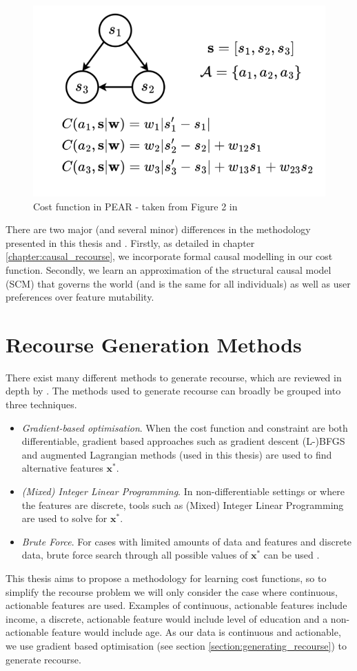\begin{figure}[!htb]
	\centering
	\includegraphics[width=0.5\linewidth]{images/detoni_et_al2.png}
	\caption{Cost function in PEAR - taken from Figure 2 in \textcite{detoniPersonalizedAlgorithmicRecourse2023}}
	\label{fig:detoni_et_al2}
\end{figure}

There are two major (and several minor) differences in the methodology presented in this thesis and \textcite{detoniPersonalizedAlgorithmicRecourse2023}. Firstly, as detailed in chapter \ref{chapter:causal_recourse}, we incorporate formal causal modelling \citep{pearl2016causal} in our cost function. Secondly, we learn an approximation of the structural causal model (SCM) that governs the world (and is the same for all individuals) as well as user preferences over feature mutability.


\section{Recourse Generation Methods}

There exist many different methods to generate recourse, which are reviewed in depth by \textcite{karimiSurveyAlgorithmicRecourse2022}. The methods used to generate recourse can broadly be grouped into three techniques.

\begin{itemize}
	\item \textit{Gradient-based optimisation}. When the cost function and constraint are both differentiable, gradient based approaches such as gradient descent (L-)BFGS and augmented Lagrangian methods (used in this thesis) are used to find alternative features $\mathbf{x}^*$.
	\item \textit{(Mixed) Integer Linear Programming}. In non-differentiable settings or where the features are discrete, tools such as (Mixed) Integer Linear Programming are used to solve for $\mathbf{x}^*$.
	\item \textit{Brute Force}. For cases with limited amounts of data and features and discrete data, brute force search through all possible values of $\mathbf{x}^*$ can be used \citep{vonkugelgenFairnessCausalAlgorithmic2022}.
\end{itemize}

This thesis aims to propose a methodology for learning cost functions, so to simplify the recourse problem we will only consider the case where continuous, actionable features are used. Examples of continuous, actionable features include income, a discrete, actionable feature would include level of education and a non-actionable feature would include age. As our data is continuous and actionable, we use gradient based optimisation (see section \ref{section:generating_recourse}) to generate recourse.
